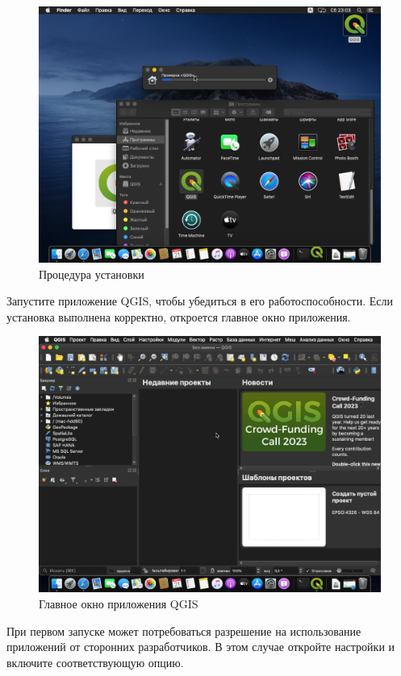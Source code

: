 \documentclass[
  12pt,
]{book}
\begin{document}
\begin{figure}
\centering
\includegraphics{images/Index0/mac06.png}
\caption{Процедура установки}
\end{figure}

Запустите приложение QGIS, чтобы убедиться в его работоспособности. Если установка выполнена корректно, откроется главное окно приложения.

\begin{figure}
\centering
\includegraphics{images/Index0/mac07.png}
\caption{Главное окно приложения QGIS}
\end{figure}

При первом запуске может потребоваться разрешение на использование приложений от сторонних разработчиков. В этом случае откройте настройки и включите соответствующую опцию.
\end{document}

